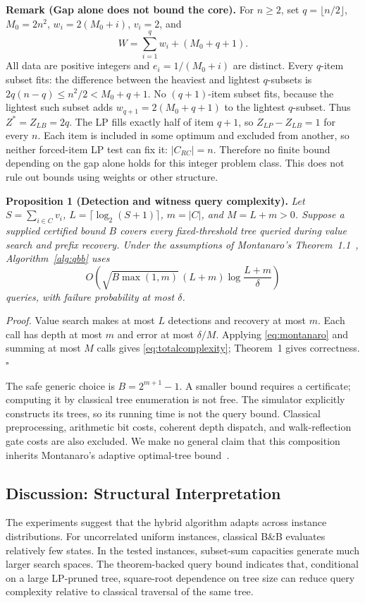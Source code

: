 \documentclass[pdflatex,sn-mathphys-num]{sn-jnl}
\begin{document}
\textbf{Remark (Gap alone does not bound the core).} For $n\ge2$, set $q=\lfloor n/2\rfloor$, $M_0=2n^2$, $w_i=2(M_0+i)$, $v_i=2$, and
\[
W=\sum_{i=1}^q w_i+(M_0+q+1).
\]
All data are positive integers and $e_i=1/(M_0+i)$ are distinct. Every $q$-item subset fits: the difference between the heaviest and lightest $q$-subsets is $2q(n-q)\le n^2/2<M_0+q+1$. No $(q+1)$-item subset fits, because the lightest such subset adds $w_{q+1}=2(M_0+q+1)$ to the lightest $q$-subset. Thus $Z^*=Z_{LB}=2q$. The LP fills exactly half of item $q+1$, so $Z_{LP}-Z_{LB}=1$ for every $n$. Each item is included in some optimum and excluded from another, so neither forced-item LP test can fix it: $|C_{RC}|=n$. Therefore no finite bound depending on the gap alone holds for this integer problem class. This does not rule out bounds using weights or other structure.

\textbf{Proposition 1 (Detection and witness query complexity).} \textit{Let $S=\sum_{i\in C}v_i$, $L=\lceil\log_2(S+1)\rceil$, $m=|C|$, and $M=L+m>0$. Suppose a supplied certified bound $B$ covers every fixed-threshold tree queried during value search and prefix recovery. Under the assumptions of Montanaro's Theorem~1.1~\cite{ref35}, Algorithm~\ref{alg:qbb} uses}
\begin{equation}
O\!\left(\sqrt{B\max(1,m)}\,(L+m)\log\frac{L+m}{\delta}\right)
\label{eq:totalcomplexity}
\end{equation}
\textit{queries, with failure probability at most $\delta$.}

\textit{Proof.} Value search makes at most $L$ detections and recovery at most $m$. Each call has depth at most $m$ and error at most $\delta/M$. Applying \eqref{eq:montanaro} and summing at most $M$ calls gives \eqref{eq:totalcomplexity}; Theorem~1 gives correctness. $\square$

The safe generic choice is $B=2^{m+1}-1$. A smaller bound requires a certificate; computing it by classical tree enumeration is not free. The simulator explicitly constructs its trees, so its running time is not the query bound. Classical preprocessing, arithmetic bit costs, coherent depth dispatch, and walk-reflection gate costs are also excluded. We make no general claim that this composition inherits Montanaro's adaptive optimal-tree bound~\cite{ref24}.

\subsection{Discussion: Structural Interpretation}
The experiments suggest that the hybrid algorithm adapts across instance distributions. For uncorrelated uniform instances, classical B\&B evaluates relatively few states. In the tested instances, subset-sum capacities generate much larger search spaces. The theorem-backed query bound indicates that, conditional on a large LP-pruned tree, square-root dependence on tree size can reduce query complexity relative to classical traversal of the same tree.
\end{document}
